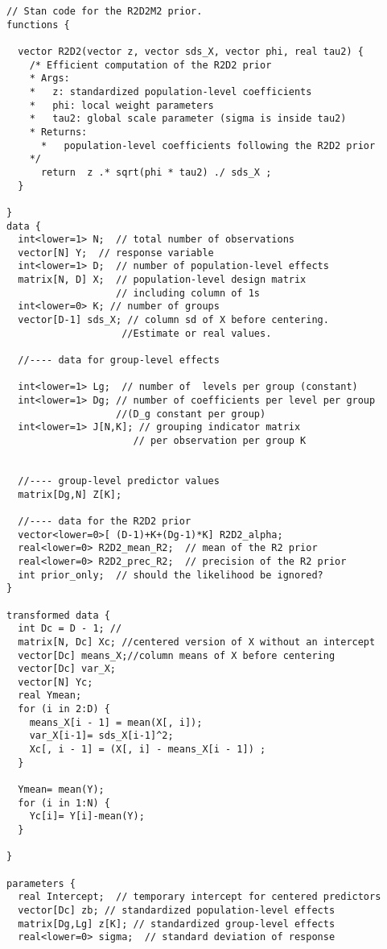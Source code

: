 \begin{small}
\begin{verbatim}
// Stan code for the R2D2M2 prior.
functions {

  vector R2D2(vector z, vector sds_X, vector phi, real tau2) {
    /* Efficient computation of the R2D2 prior
    * Args:
    *   z: standardized population-level coefficients
    *   phi: local weight parameters
    *   tau2: global scale parameter (sigma is inside tau2)
    * Returns:
      *   population-level coefficients following the R2D2 prior
    */
      return  z .* sqrt(phi * tau2) ./ sds_X ;
  }

}
data {
  int<lower=1> N;  // total number of observations
  vector[N] Y;  // response variable
  int<lower=1> D;  // number of population-level effects
  matrix[N, D] X;  // population-level design matrix
                   // including column of 1s
  int<lower=0> K; // number of groups
  vector[D-1] sds_X; // column sd of X before centering.
                    //Estimate or real values.

  //---- data for group-level effects

  int<lower=1> Lg;  // number of  levels per group (constant)
  int<lower=1> Dg; // number of coefficients per level per group
                   //(D_g constant per group)
  int<lower=1> J[N,K]; // grouping indicator matrix
                      // per observation per group K


  //---- group-level predictor values
  matrix[Dg,N] Z[K];

  //---- data for the R2D2 prior
  vector<lower=0>[ (D-1)+K+(Dg-1)*K] R2D2_alpha;
  real<lower=0> R2D2_mean_R2;  // mean of the R2 prior
  real<lower=0> R2D2_prec_R2;  // precision of the R2 prior
  int prior_only;  // should the likelihood be ignored?
}

transformed data {
  int Dc = D - 1; //
  matrix[N, Dc] Xc; //centered version of X without an intercept
  vector[Dc] means_X;//column means of X before centering
  vector[Dc] var_X;
  vector[N] Yc;
  real Ymean;
  for (i in 2:D) {
    means_X[i - 1] = mean(X[, i]);
    var_X[i-1]= sds_X[i-1]^2;
    Xc[, i - 1] = (X[, i] - means_X[i - 1]) ;
  }

  Ymean= mean(Y);
  for (i in 1:N) {
    Yc[i]= Y[i]-mean(Y);
  }

}

parameters {
  real Intercept;  // temporary intercept for centered predictors
  vector[Dc] zb; // standardized population-level effects
  matrix[Dg,Lg] z[K]; // standardized group-level effects
  real<lower=0> sigma;  // standard deviation of response


\end{verbatim}
\end{small}
